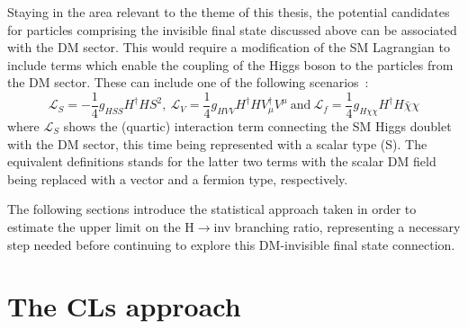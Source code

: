 \hspace{10pt} Staying in the area relevant to the theme of this thesis, the potential candidates for particles comprising the invisible final state discussed above can be associated with the DM sector. This would require a modification of the SM Lagrangian to include terms which enable the coupling of the Higgs boson to the particles from the DM sector. These can include one of the following scenarios~\cite{paper:hinv_run1, paper:hig_portal_models1,yellow_report}:
\begin{equation}
    \mathcal{L}_{S} = -\frac{1}{4}g_{HSS}H^\dagger H S^2,~\mathcal{L}_{V} = \frac{1}{4}g_{HVV}H^\dagger HV_\mu^\dagger V^\mu~\text{and}~\mathcal{L}_{f} = \frac{1}{4}g_{H\chi\chi}H^\dagger H\bar{\chi}\chi
\end{equation}
where $\mathcal{L}_{S}$ shows the (quartic) interaction term connecting the SM Higgs doublet with the DM sector, this time being represented with a scalar type (S). The equivalent definitions stands for the latter two terms with the scalar DM field being replaced with a vector and a fermion type, respectively.

\hspace{10pt} The following sections introduce the statistical approach taken in order to estimate the upper limit on the H$\rightarrow$inv branching ratio, representing a necessary step needed before continuing to explore this DM-invisible final state connection.


\section{The CLs approach}

